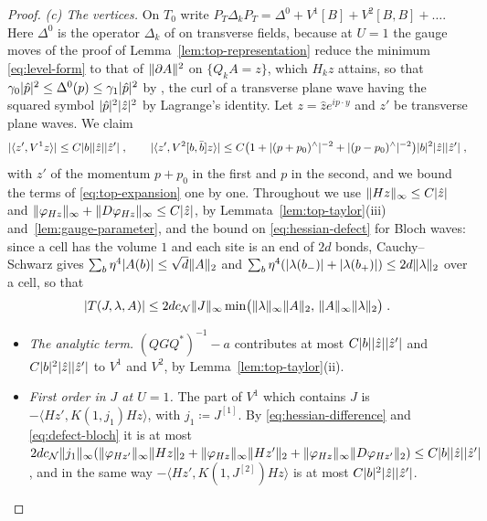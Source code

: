 \documentclass[11pt]{preprint}
\DeclarePairedDelimiter{\abs}{\lvert}{\rvert}
\DeclarePairedDelimiter{\norm}{\lVert}{\rVert}
\numberwithin{equation}{section}
\theoremstyle{definition}
\theoremstyle{remark}
\theoremstyle{plain}
\begin{document}
\begin{proof}
\emph{(c) The vertices.} On $T_0$ write $P_T\Delta_kP_T = \Delta^0 + V^1[B] + V^2[B, B] + \dots$. Here $\Delta^0$ is the operator $\Delta_k$ of \cite[(1.65), p.~29]{BalabanPRT1} on transverse fields, because at $U = 1$ the gauge moves of the proof of Lemma~\ref{lem:top-representation} reduce the minimum \eqref{eq:level-form} to that of $\norm{\partial A}^2$ on $\{ Q_kA = z \}$, which $H_kz$ attains, so that $\gamma_0\abs{\hat p}^2 \leq \Delta^0(p) \leq \gamma_1\abs{\hat p}^2$ by \cite[(1.66)--(1.67), p.~29]{BalabanPRT1}, the curl of a transverse plane wave having the squared symbol $\abs{\hat p}^2\abs{\hat z}^2$ by Lagrange's identity. Let $z = \hat ze^{ip\cdot y}$ and $z'$ be transverse plane waves. We claim
\begin{equation}\label{eq:top-vertices}
    \abs{\langle z', V^1z \rangle} \leq C\abs{b}\abs{\hat z}\abs{\hat z'}\;,
    \qquad
    \abs{\langle z', V^2[b, \bar b]z \rangle} \leq C\bigl(1 + \abs{(p + p_0)^\wedge}^{-2} + \abs{(p - p_0)^\wedge}^{-2}\bigr)\abs{b}^2\abs{\hat z}\abs{\hat z'}\;,
\end{equation}
with $z'$ of the momentum $p + p_0$ in the first and $p$ in the second, and we bound the terms of \eqref{eq:top-expansion} one by one. Throughout we use $\norm{Hz}_\infty \leq C\abs{\hat z}$ and $\norm{\varphi_{Hz}}_\infty + \norm{D\varphi_{Hz}}_\infty \leq C\abs{\hat z}$, by Lemmata~\ref{lem:top-taylor}(iii) and~\ref{lem:gauge-parameter}, and the bound on \eqref{eq:hessian-defect} for Bloch waves: since a cell has the volume $1$ and each site is an end of $2d$ bonds, Cauchy--Schwarz gives $\sum_b\eta^4\abs{A(b)} \leq \sqrt d\norm{A}_2$ and $\sum_b\eta^4(\abs{\lambda(b_-)} + \abs{\lambda(b_+)}) \leq 2d\norm{\lambda}_2$ over a cell, so that
\begin{equation}\label{eq:defect-bloch}
    \abs{T(J, \lambda, A)} \leq 2dc_{\mathcal N}\norm{J}_\infty\min\bigl(\norm{\lambda}_\infty\norm{A}_2,\, \norm{A}_\infty\norm{\lambda}_2\bigr)\;.
\end{equation}
\begin{itemize}
\item \emph{The analytic term.} $(QGQ^*)^{-1} - a$ contributes at most $C\abs{b}\abs{\hat z}\abs{\hat z'}$ and $C\abs{b}^2\abs{\hat z}\abs{\hat z'}$ to $V^1$ and $V^2$, by Lemma~\ref{lem:top-taylor}(ii).
\item \emph{First order in $J$ at $U = 1$.} The part of $V^1$ which contains $J$ is $-\langle Hz', K(1, j_1)Hz \rangle$, with $j_1 \coloneqq J^{[1]}$. By \eqref{eq:hessian-difference} and \eqref{eq:defect-bloch} it is at most $2dc_{\mathcal N}\norm{j_1}_\infty(\norm{\varphi_{Hz'}}_\infty\norm{Hz}_2 + \norm{\varphi_{Hz}}_\infty\norm{Hz'}_2 + \norm{\varphi_{Hz}}_\infty\norm{D\varphi_{Hz'}}_2) \leq C\abs{b}\abs{\hat z}\abs{\hat z'}$, and in the same way $-\langle Hz', K(1, J^{[2]})Hz \rangle$ is at most $C\abs{b}^2\abs{\hat z}\abs{\hat z'}$.

\end{itemize}
\end{proof}
\end{document}
